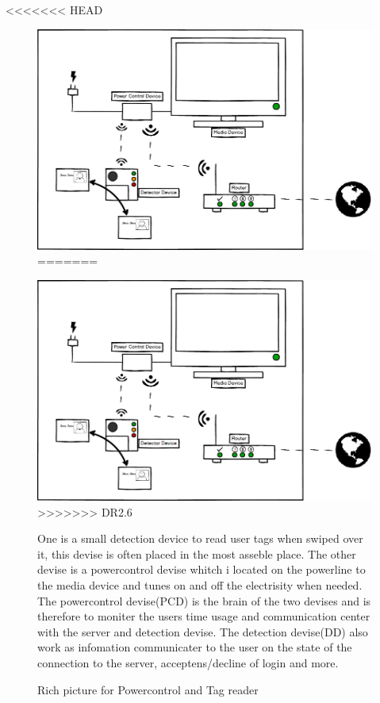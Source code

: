 <<<<<<< HEAD
\begin{figure}[h]
	\centering
		\includegraphics[width=1.00\textwidth]{images/Power&Tagdevice.png}
=======
\begin{center}
	\includegraphics[width=1.00\textwidth]{images/Power&Tagdevice.png}	
>>>>>>> DR2.6
	\caption{Rich picture for Powercontrol and Tag reader}
	\label{fig:Power&Tagdevice}
\end{center}

One is a small detection device to read user tags when swiped over it, this devise is often placed in the most asseble place. \newline
The other devise is a powercontrol devise whitch i located on the powerline to the media device and tunes on and off the electrisity when needed.\newline
The powercontrol devise(PCD) is the brain of the two devises and is therefore to moniter the users time usage and communication center with the server and detection devise. \newline
The detection devise(DD) also work as infomation communicater to the user on the state of the connection to the server, acceptens/decline of login and more. \newline    


\end{figure}
